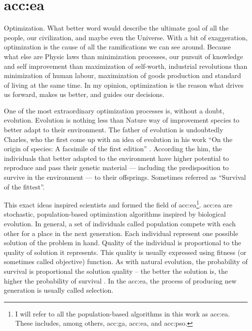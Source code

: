 \chapter{\texorpdfstring{\acrlong*{acc:ea}}{}}

Optimization. What better word would describe the ultimate goal of all the people, our civilization, and maybe even the Universe. With a bit of exaggeration, optimization is the cause of all the ramifications we can see around. Because what else are Physic laws than minimization processes, our pursuit of knowledge and self improvement than maximization of self-worth, industrial revolutions than minimization of human labour, maximization of goods production and standard of living at the same time. In my opinion, optimization is the reason what drives us forward, makes us better, and guides our decisions.

One of the most extraordinary optimization processes is, without a doubt, evolution. Evolution is nothing less than Nature way of improvement species to better adapt to their environment. The father of evolution is undoubtedly Charles, who the first come up with an idea of evolution in his work \enquote{On the origin of species: A facsimile of the first edition} \citep{darwin1964origin}. According the him, the individuals that better adapted to the environment have higher potential to reproduce and pass their genetic material --- including the predisposition to survive in the environment --- to their offsprings. Sometimes referred as \enquote{Survival of the fittest}.

This exact ideas inspired scientists and formed the field of \acrfull{acc:ea}\footnote{I will refer to all the population-based algorithms in this work as \acrlong*{acc:ea}. These includes, among others, \acrlong*{acc:ga}, \acrlong*{acc:ea}, and \acrlong*{acc:pso}.}.
\acrshort{acc:ea} are stochastic, population-based optimization algorithms inspired by biological evolution. In general, a set of individuals called population compete with each other for a place in the next generation. Each individual represent one possible solution of the problem in hand. Quality of the individual is proportional to the quality of solution it represents. This quality is usually expressed using fitness (or sometimes called objective) function. As with natural evolution, the probability of survival is proportional the solution quality -- the better the solution is, the higher the probability of survival \citep{IntroductionToEA}. In the \acrshort{acc:ea}, the process of producing new generation is usually called selection.

